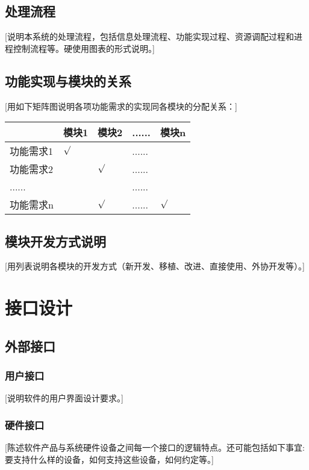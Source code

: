 \documentclass[10pt,a4paper,titlepage]{article} %
\begin{document}
\subsection{处理流程}
[说明本系统的处理流程，包括信息处理流程、功能实现过程、资源调配过程和进程控制流程等。硬使用图表的形式说明。] \newline
\subsection{功能实现与模块的关系}
[用如下矩阵图说明各项功能需求的实现同各模块的分配关系：]
\begin{center}  
\begin{tabular}{|p{2cm}<{\centering}|p{2cm}<{\centering}|p{2cm}<{\centering}|p{2cm}<{\centering}|p{2cm}<{\centering}|}
\hline  
           & 模块1 	 & 模块2   & ...... & 模块n  \\ \hline  
 功能需求1 & $\surd$ &         & ...... &    \\ \hline
 功能需求2 &         & $\surd$ & ...... &    \\ \hline
 ......    &         &         & ...... &    \\ \hline
 功能需求n &         & $\surd$ & ...... & $\surd$  \\ \hline
\end{tabular}  
\end{center}  

\subsection{模块开发方式说明}
[用列表说明各模块的开发方式（新开发、移植、改进、直接使用、外协开发等）。]\newline
\section{接口设计}
\subsection{外部接口}
\subsubsection{用户接口}
[说明软件的用户界面设计要求。]\newline
\subsubsection{硬件接口}
[陈述软件产品与系统硬件设备之间每一个接口的逻辑特点。还可能包括如下事宜: 要支持什么样的设备，如何支持这些设备，如何约定等。]\newline
\end{document}
